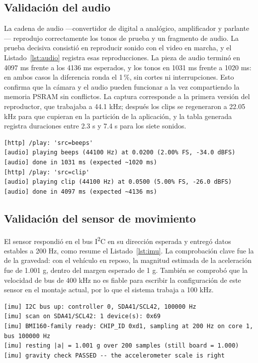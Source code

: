 \documentclass[journal]{IEEEtran}
\begin{document}
\subsection{Validación del audio}
La cadena de audio ---convertidor de digital a analógico, amplificador y parlante--- reprodujo correctamente los tonos de prueba y un fragmento de audio. La prueba decisiva consistió en reproducir sonido con el video en marcha, y el Listado~\ref{lst:audio} registra esas reproducciones. La pieza de audio terminó en 4097 ms frente a los 4136 ms esperados, y los tonos en 1031 ms frente a 1020 ms: en ambos casos la diferencia ronda el 1\,\%, sin cortes ni interrupciones. Esto confirma que la cámara y el audio pueden funcionar a la vez compartiendo la memoria PSRAM sin conflictos. La captura corresponde a la primera versión del reproductor, que trabajaba a 44.1 kHz; después los clips se regeneraron a 22.05 kHz para que cupieran en la partición de la aplicación, y la tabla generada registra duraciones entre 2.3 s y 7.4 s para los siete sonidos.

\begin{lstlisting}[style=consola, caption={Registro de reproducción de audio con el video en marcha.}, label={lst:audio}]
[http] /play: 'src=beeps'
[audio] playing beeps (44100 Hz) at 0.0200 (2.00% FS, -34.0 dBFS)
[audio] done in 1031 ms (expected ~1020 ms)
[http] /play: 'src=clip'
[audio] playing clip (44100 Hz) at 0.0500 (5.00% FS, -26.0 dBFS)
[audio] done in 4097 ms (expected ~4136 ms)
\end{lstlisting}

\subsection{Validación del sensor de movimiento}
El sensor respondió en el bus I\textsuperscript{2}C en su dirección esperada y entregó datos estables a 200 Hz, como resume el Listado~\ref{lst:imu}. La comprobación clave fue la de la gravedad: con el vehículo en reposo, la magnitud estimada de la aceleración fue de 1.001 g, dentro del margen esperado de 1 g. También se comprobó que la velocidad de bus de 400 kHz no es fiable para escribir la configuración de este sensor en el montaje actual, por lo que el sistema trabaja a 100 kHz.

\begin{lstlisting}[style=consola, caption={Arranque y verificación de gravedad del sensor de movimiento.}, label={lst:imu}]
[imu] I2C bus up: controller 0, SDA41/SCL42, 100000 Hz
[imu] scan on SDA41/SCL42: 1 device(s): 0x69
[imu] BMI160-family ready: CHIP_ID 0xd1, sampling at 200 Hz on core 1, bus 100000 Hz
[imu] resting |a| = 1.001 g over 200 samples (still board = 1.000)
[imu] gravity check PASSED -- the accelerometer scale is right
\end{lstlisting}
\end{document}
